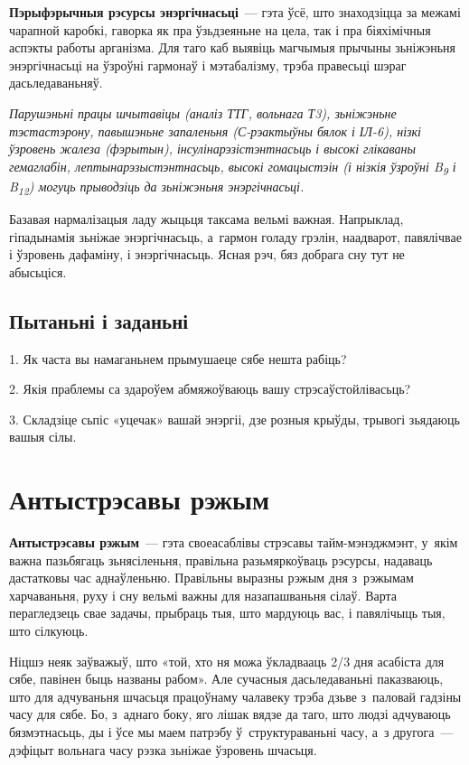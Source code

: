 \textbf{Пэрыфэрычныя рэсурсы энэргічнасьці}~--- гэта ўсё, што знаходзіцца за межамі чарапной каробкі, гаворка як пра ўзьдзеяньне на цела, так і пра біяхімічныя аспэкты работы арганізма. Для таго каб выявіць магчымыя прычыны зьніжэньня энэргічнасьці на ўзроўні гармонаў і мэтабалізму, трэба правесьці шэраг дасьледаваньняў.

\emph{Парушэньні працы шчытавіцы (аналіз ТТГ, вольнага Т3), зьніжэньне тэстастэрону, павышэньне запаленьня (С-рэактыўны бялок і ІЛ-6), нізкі ўзровень жалеза (фэрытын), інсулінарэзістэнтнасьць і высокі глікаваны гемаглабін, лептынарэзыстэнтнасьць, высокі гомацыстэін (і нізкія ўзроўні B\textsubscript{9} і B\textsubscript{12}) могуць прыводзіць да зьніжэньня энэргічнасьці.}

Базавая нармалізацыя ладу жыцьця таксама вельмі важная. Напрыклад, гіпадынамія зьніжае энэргічнасьць, а~гармон голаду грэлін, наадварот, павялічвае і ўзровень дафаміну, і энэргічнасьць. Ясная рэч, бяз добрага сну тут не абысьціся.

\subsection*{Пытаньні і заданьні}

1. Як часта вы намаганьнем прымушаеце сябе нешта рабіць?

2. Якія праблемы са здароўем абмяжоўваюць вашу стрэсаўстойлівасьць?

3. Складзіце сьпіс «уцечак» вашай энэргіі, дзе розныя крыўды, трывогі зьядаюць вашыя сілы.


\section{Антыстрэсавы рэжым}

\textbf{Антыстрэсавы рэжым}~--- гэта своеасаблівы стрэсавы тайм-мэнэджмэнт, у~якім важна пазьбягаць зьнясіленьня, правільна разьмяркоўваць рэсурсы, надаваць дастатковы час аднаўленьню. Правільны выразны рэжым дня з~рэжымам харчаваньня, руху і сну вельмі важны для назапашваньня сілаў. Варта перагледзець свае задачы, прыбраць тыя, што мардуюць вас, і павялічыць тыя, што сілкуюць.


Ніцшэ неяк заўважыў, што «той, хто ня можа ўкладвааць 2/3 дня асабіста для сябе, павінен быць названы рабом». Але сучасныя дасьледаваньні паказваюць, што для адчуваньня шчасьця працоўнаму чалавеку трэба дзьве з~паловай гадзіны часу для сябе. Бо, з~аднаго боку, яго лішак вядзе да таго, што людзі адчуваюць бязмэтнасьць, ды і ўсе мы маем патрэбу ў~структураваньні часу, а~з другога~--- дэфіцыт вольнага часу рэзка зьніжае ўзровень шчасьця.

